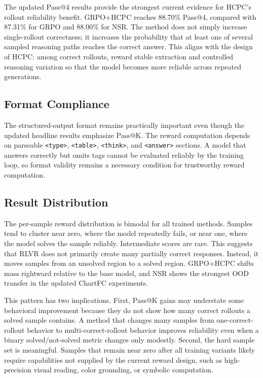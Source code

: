 \documentclass{iutbscthesis}
\begin{document}
The updated Pass@4 results provide the strongest current evidence for HCPC's rollout reliability benefit. GRPO+HCPC reaches 88.70\% Pass@4, compared with 87.31\% for GRPO and 88.00\% for NSR. The method does not simply increase single-rollout correctness; it increases the probability that at least one of several sampled reasoning paths reaches the correct answer. This aligns with the design of HCPC: among correct rollouts, reward stable extraction and controlled reasoning variation so that the model becomes more reliable across repeated generations.

\subsection{Format Compliance}

The structured-output format remains practically important even though the updated headline results emphasize Pass@K. The reward computation depends on parseable \texttt{<type>}, \texttt{<table>}, \texttt{<think>}, and \texttt{<answer>} sections. A model that answers correctly but omits tags cannot be evaluated reliably by the training loop, so format validity remains a necessary condition for trustworthy reward computation.

\subsection{Result Distribution}

The per-sample reward distribution is bimodal for all trained methods. Samples tend to cluster near zero, where the model repeatedly fails, or near one, where the model solves the sample reliably. Intermediate scores are rare. This suggests that RLVR does not primarily create many partially correct responses. Instead, it moves samples from an unsolved region to a solved region. GRPO+HCPC shifts mass rightward relative to the base model, and NSR shows the strongest OOD transfer in the updated ChartFC experiments.

This pattern has two implications. First, Pass@K gains may understate some behavioral improvement because they do not show how many correct rollouts a solved sample contains. A method that changes many samples from one-correct-rollout behavior to multi-correct-rollout behavior improves reliability even when a binary solved/not-solved metric changes only modestly. Second, the hard sample set is meaningful. Samples that remain near zero after all training variants likely require capabilities not supplied by the current reward design, such as high-precision visual reading, color grounding, or symbolic computation.
\end{document}

